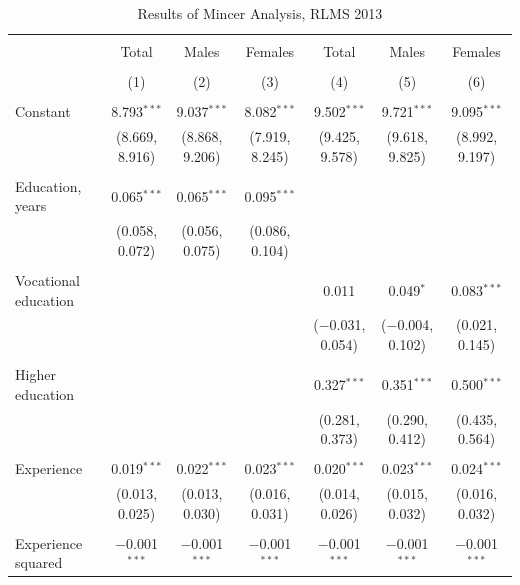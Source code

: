 \documentclass[alpha-refs]{wiley-article-01g}
\begin{document}
\begin{landscape}
	
	\fontsize{9}{11}
	\selectfont
	
	\begin{table}[!htbp] \centering 
\renewcommand{\arraystretch}{1.0}
		\caption{Results of Mincer Analysis, RLMS 2013} 
		\label{} 
		\begin{tabular}{@{\extracolsep{5pt}}lcccccc} 
			\\[-.8ex]\hline 
			\hline \\[-.8ex] 
			& Total & Males & Females & Total & Males & Females \\ 
			\\[-.8ex] & (1) & (2) & (3) & (4) & (5) & (6)\\ 
			\hline \\[-.8ex] 
			Constant & 8.793$^{***}$ & 9.037$^{***}$ & 8.082$^{***}$ & 9.502$^{***}$ & 9.721$^{***}$ & 9.095$^{***}$ \\ 
			& (8.669, 8.916) & (8.868, 9.206) & (7.919, 8.245) & (9.425, 9.578) & (9.618, 9.825) & (8.992, 9.197) \\ 
			& & & & & & \\ 
			Education, years & 0.065$^{***}$ & 0.065$^{***}$ & 0.095$^{***}$ &  &  &  \\ 
			& (0.058, 0.072) & (0.056, 0.075) & (0.086, 0.104) &  &  &  \\ 
			& & & & & & \\ 
			Vocational education &  &  &  & 0.011 & 0.049$^{*}$ & 0.083$^{***}$ \\ 
			&  &  &  & ($-$0.031, 0.054) & ($-$0.004, 0.102) & (0.021, 0.145) \\ 
			& & & & & & \\ 
			Higher education &  &  &  & 0.327$^{***}$ & 0.351$^{***}$ & 0.500$^{***}$ \\ 
			&  &  &  & (0.281, 0.373) & (0.290, 0.412) & (0.435, 0.564) \\ 
			& & & & & & \\ 
			Experience & 0.019$^{***}$ & 0.022$^{***}$ & 0.023$^{***}$ & 0.020$^{***}$ & 0.023$^{***}$ & 0.024$^{***}$ \\ 
			& (0.013, 0.025) & (0.013, 0.030) & (0.016, 0.031) & (0.014, 0.026) & (0.015, 0.032) & (0.016, 0.032) \\ 
			& & & & & & \\ 
			Experience squared & $-$0.001$^{***}$ & $-$0.001$^{***}$ & $-$0.001$^{***}$ & $-$0.001$^{***}$ & $-$0.001$^{***}$ & $-$0.001$^{***}$ \\ 

\end{tabular}
\end{table}
\end{landscape}
\end{document}
